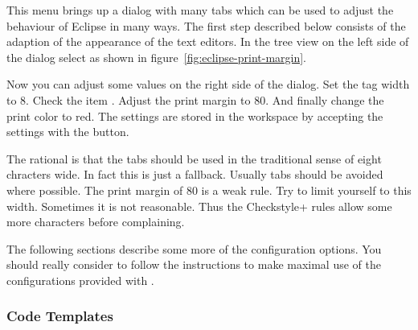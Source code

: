 This menu brings up a dialog with many tabs which can be used to
adjust the behaviour of Eclipse in many ways. The first step described
below consists of the adaption of the appearance of the text editors.
In the tree view on the left side of the dialog select  as shown in
figure~\ref{fig:eclipse-print-margin}.

Now you can adjust some values on the right side of the dialog. Set
the tag width to 8. Check the item . Adjust
the print margin to 80. And finally change the print color to red. The
settings are stored in the workspace by accepting the settings with
the  button.

The rational is that the tabs should be used in the traditional sense
of eight chracters wide. In fact this is just a fallback. Usually tabs
should be avoided where possible. The print margin of 80 is a weak
rule. Try to limit yourself to this width. Sometimes it is not
reasonable. Thus the \+Checkstyle+ rules allow some more characters
before complaining.

The following sections describe some more of the configuration
options. You should really consider to follow the instructions to make
maximal use of the configurations provided with \ExTeX.



\subsubsection{Code Templates}

